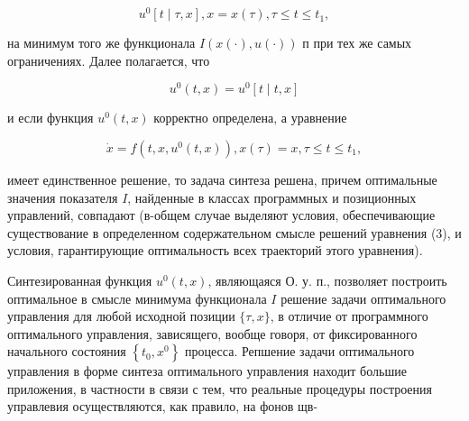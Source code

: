 \documentclass[10pt]{article}
\begin{document}
\[

u^{0}[t \mid \tau, x], x=x(\tau), \tau \leqslant t \leqslant t_{1},

\]



на минимум того же функционала $I(x(\cdot), u(\cdot))$ п при тех же самых ограничениях. Далее полагается, что



\[

u^{0}(t, x)=u^{0}[t \mid t, x]

\]



и если функция $u^{0}(t, x)$ корректно определена, а уравнение



\[

\dot{x}=f\left(t, x, u^{0}(t, x)\right), x(\tau)=x, \tau \leqslant t \leqslant t_{1},

\]



имеет единственное решение, то задача синтеза решена, причем оптимальные значения показателя $I$, найденные в классах программных и позиционных управлений, совпадают (в-общем случае выделяют условия, обеспечивающие существование в определенном содержательном смысле решений уравнения (3), и условия, гарантирующие оптимальность всех траекторий этого уравнения).



Синтезированная функция $u^{0}(t, x)$, являющаяся О. у. п., позволяет построить оптимальное в смысле минимума функционала $I$ решение задачи оптимального управления для любой исходной позиции $\{\tau, x\}$, в отличие от программного оптимального управления, зависящего, вообще говоря, от фиксированного начального состояния $\left\{t_{0}, x^{0}\right\}$ процесса. Репшение задачи оптимального управления в форме синтеза оптимального управления находит большие приложения, в частности в связи с тем, что реальные процедуры построения управлевия осуществляются, как правило, на фонов щв-
\end{document}
